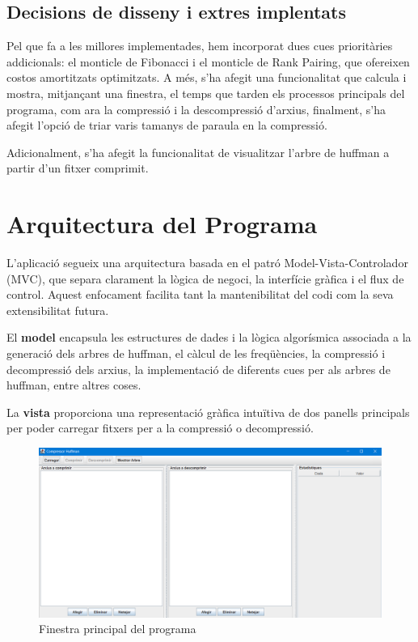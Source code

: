 \documentclass{ieeetj}
\begin{document}
\subsection{Decisions de disseny i extres implentats}

Pel que fa a les millores implementades, hem incorporat dues cues prioritàries addicionals: el monticle de Fibonacci i el monticle de Rank Pairing, que ofereixen costos amortitzats optimitzats. A més, s'ha afegit una funcionalitat que calcula i mostra, mitjançant una finestra, el temps que tarden els processos principals del programa, com ara la compressió i la descompressió d'arxius, finalment, s'ha afegit l'opció de triar varis tamanys de paraula en la compressió.

Adicionalment, s'ha afegit la funcionalitat de visualitzar l'arbre de huffman a partir d'un fitxer comprimit.



\section{Arquitectura del Programa}

L’aplicació segueix una arquitectura basada en el patró Model-Vista-Controlador (MVC), que separa clarament la lògica de negoci, la interfície gràfica i el flux de control. Aquest enfocament facilita tant la mantenibilitat del codi com la seva extensibilitat futura.\newline

El \textbf{model} encapsula les estructures de dades i la lògica algorísmica associada a la generació dels arbres de huffman, el càlcul de les freqüències, la compressió i decompressió dels arxius, la implementació de diferents cues per als arbres de huffman, entre altres coses.

La \textbf{vista} proporciona una representació gràfica intuïtiva de dos panells principals per poder carregar fitxers per a la compressió o decompressió.

\begin{figure}[h]
    \centering
    \includegraphics[width=\linewidth]{png/vista.png}
    \caption{Finestra principal del programa}
    \label{fig:enter-label}
\end{figure}
\end{document}
